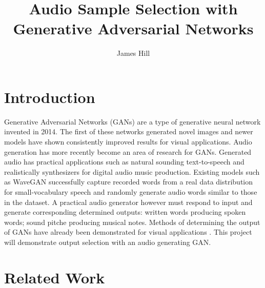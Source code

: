 \documentclass[a4paper, dvipsnames, titlepage]{article}
\title{Audio Sample Selection with Generative Adversarial Networks}
\author{James Hill}
\date{}
\begin{document}
\maketitle
\tableofcontents

\newpage

\section{Introduction}

Generative Adversarial Networks (GANs) \citep{2014arXiv1406.2661G} are a type of generative neural network invented in 2014.
The first of these networks generated novel images and newer models have shown consistently improved results for visual applications.
\newline
\newline
Audio generation has more recently become an area of research for GANs.
Generated audio has practical applications such as natural sounding text-to-speech and realistically synthesizers for digital audio music production.
Existing models such as WaveGAN \citep{2018arXiv180204208D} successfully capture recorded words from a real data distribution for small-vocabulary speech and randomly generate audio words similar to those in the dataset.
\newline
\newline
A practical audio generator however must respond to input and generate corresponding determined outputs: written words producing spoken words; sound pitche producing musical notes.
Methods of determining the output of GANs have already been demonstrated for visual applications \citep{2014arXiv1411.1784M}.
This project will demonstrate output selection with an audio generating GAN.

\newpage

\section{Related Work}
\end{document}
